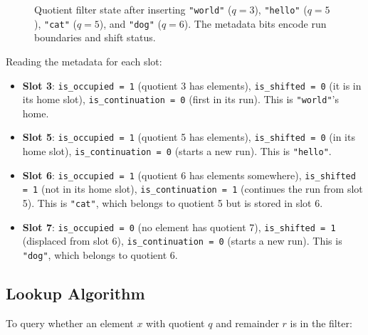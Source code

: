 \begin{figure}[H]
  \caption{Quotient filter state after inserting \texttt{"world"} 
           ($q = 3$), \texttt{"hello"} ($q = 5$), \texttt{"cat"} 
           ($q = 5$), and \texttt{"dog"} ($q = 6$). The metadata bits 
           encode run boundaries and shift status.}
  \label{fig:quotient-metadata}
\end{figure}

Reading the metadata for each slot:
\begin{itemize}
  \item \textbf{Slot 3}: \texttt{is\_occupied = 1} (quotient 3 has 
        elements), \texttt{is\_shifted = 0} (it is in its home slot), 
        \texttt{is\_continuation = 0} (first in its run). This is 
        \texttt{"world"}'s home.
  \item \textbf{Slot 5}: \texttt{is\_occupied = 1} (quotient 5 has 
        elements), \texttt{is\_shifted = 0} (in its home slot), 
        \texttt{is\_continuation = 0} (starts a new run). This is 
        \texttt{"hello"}.
  \item \textbf{Slot 6}: \texttt{is\_occupied = 1} (quotient 6 has 
        elements somewhere), \texttt{is\_shifted = 1} (not in its home 
        slot), \texttt{is\_continuation = 1} (continues the run from 
        slot 5). This is \texttt{"cat"}, which belongs to quotient 5 but 
        is stored in slot 6.
  \item \textbf{Slot 7}: \texttt{is\_occupied = 0} (no element has 
        quotient 7), \texttt{is\_shifted = 1} (displaced from slot 6), 
        \texttt{is\_continuation = 0} (starts a new run). This is 
        \texttt{"dog"}, which belongs to quotient 6.
\end{itemize}

\subsection{Lookup Algorithm}

To query whether an element $x$ with quotient $q$ and remainder $r$ is 
in the filter:

